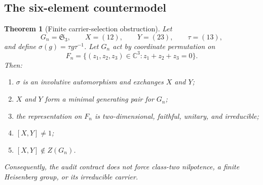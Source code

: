 \documentclass[11pt,a4paper]{article}
\newtheorem{theorem}{Theorem}[section]
\newcommand{\Sym}{\mathfrak{S}}
\begin{document}
  \subsection{The six-element countermodel}

    \begin{theorem}[Finite carrier-selection obstruction]
      \label{thm:main}
      Let
      \[
        G_n=\Sym_3,\qquad X=(12),\qquad Y=(23),\qquad \tau=(13),
      \]
      and define $\sigma(g)=\tau g\tau^{-1}$.
      Let $G_n$ act by coordinate permutation on
      \[
        F_n=\bigl\{(z_1,z_2,z_3)\in\mathbb{C}^3:
        z_1+z_2+z_3=0\bigr\}.
      \]
      Then:
      \begin{enumerate}
        \item $\sigma$ is an involutive automorphism and exchanges $X$ and $Y$;
        \item $X$ and $Y$ form a minimal generating pair for $G_n$;
        \item the representation on $F_n$ is two-dimensional, faithful, unitary,
        and irreducible;
        \item $[X,Y]\neq 1$;
        \item $[X,Y]\notin Z(G_n)$.
      \end{enumerate}
      Consequently, the audit contract does not force class-two nilpotence, a
      finite Heisenberg group, or its irreducible carrier.
    \end{theorem}
\end{document}
